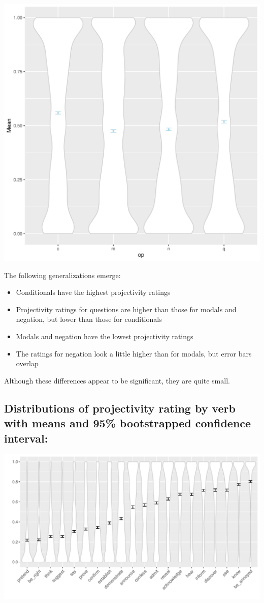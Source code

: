 \documentclass[10pt]{article}\usepackage[]{graphicx}\usepackage[dvipsnames]{xcolor}
\newenvironment{knitrout}{}{} %
\begin{document}
\begin{knitrout}
\color{fgcolor}

{\centering \includegraphics[width=.5\textwidth]{figures/summary-op-1} 

}


\end{knitrout}

\noindent The following generalizations emerge:
\begin{itemize}
  \item Conditionals have the highest projectivity ratings
  \item Projectivity ratings for questions are higher than those for modals and negation, but lower than those for conditionals
  \item Modals and negation have the lowest projectivity ratings
  \item The ratings for negation look a little higher than for modals, but error bars overlap
\end{itemize}

\noindent Although these differences appear to be significant, they are quite small.\\

\newpage
\subsection{Distributions of projectivity rating by verb with means and 95\% bootstrapped confidence interval:}

\begin{knitrout}
\color{fgcolor}

{\centering \includegraphics[width=\linewidth]{figures/summary-verb-1} 

}


\end{knitrout}
\end{document}
